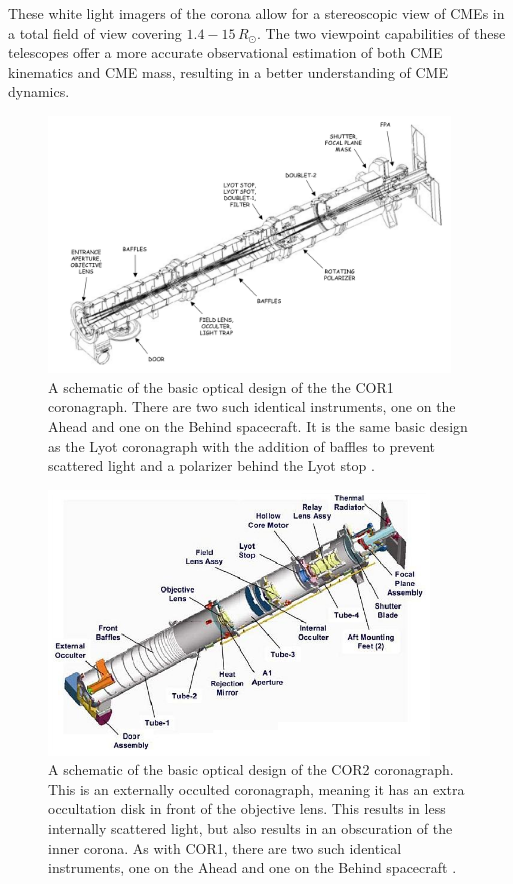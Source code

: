 These white light imagers of the corona allow for a stereoscopic view of CMEs in a total field of view covering $1.4 - 15\,R_{\odot}$. The two viewpoint capabilities of these telescopes offer a more accurate observational estimation of both CME kinematics and CME mass, resulting in a better understanding of CME dynamics.
\begin{figure}[!t]
\begin{center}
\includegraphics[width=0.95\textwidth]{images/COR1_design}
\caption{A schematic of the basic optical design of the the COR1 coronagraph. There are two such identical instruments, one on the Ahead and one on the Behind spacecraft. It is the same basic design as the Lyot coronagraph with the addition of baffles to prevent scattered light and a polarizer behind the Lyot stop \citep{thomp2008}.}
\label{fig:COR1_design}
\end{center}
\end{figure}
\begin{figure}[!t]
\begin{center}
\includegraphics[width=0.9\textwidth]{images/cor2}
\caption{A schematic of the basic optical design of the COR2 coronagraph. This is an externally occulted coronagraph, meaning it has an extra occultation disk in front of the objective lens. This results in less internally scattered light, but also results in an obscuration of the inner corona. As with COR1, there are two such identical instruments, one on the Ahead and one on the Behind spacecraft \citep{how08}.}
\label{fig:cor2}
\end{center}
\end{figure}


